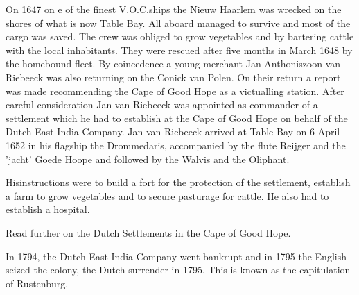 On 1647 on e of the finest V.O.C.ships the Nieuw Haarlem was 
wrecked on the shores of what is now Table Bay. All aboard managed 
to survive and most of the cargo was saved. The crew was obliged to 
grow vegetables and by bartering cattle with the local inhabitants. 
They were rescued after five months in March 1648 by the homebound fleet. 
By coincedence a young merchant Jan Anthoniszoon van Riebeeck was also 
returning on the Conick van Polen. On their return a report was made 
recommending the Cape of Good Hope as a victualling station. 
After careful consideration Jan van Riebeeck was appointed 
as commander of a settlement which he had to establish at the 
Cape of Good Hope on behalf of the Dutch East India Company. 
Jan van Riebeeck arrived at Table Bay on 6 April 1652 in his 
flagship the Drommedaris, accompanied by the flute Reijger and the 
'jacht' Goede Hoope and followed by the Walvis and the Oliphant.

Hisinstructions were to build a fort for the protection of the 
settlement, establish a farm to grow vegetables and to secure 
pasturage for cattle. He also had to establish a hospital.

Read further on the Dutch Settlements in the Cape of Good Hope.

In 1794, the Dutch East India Company went bankrupt and in 1795 
the English seized the colony, the Dutch  surrender in 1795. 
This is known as the capitulation of Rustenburg.

     